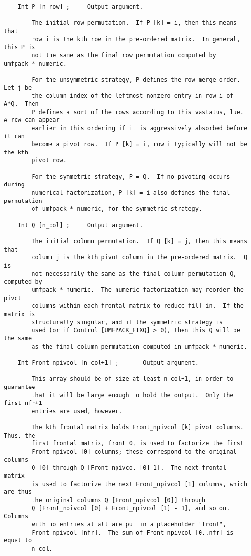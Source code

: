 \documentclass[11pt]{article}
\begin{document}
{\begin{verbatim}
    Int P [n_row] ;     Output argument.

        The initial row permutation.  If P [k] = i, then this means that
        row i is the kth row in the pre-ordered matrix.  In general, this P is
        not the same as the final row permutation computed by umfpack_*_numeric.

        For the unsymmetric strategy, P defines the row-merge order.  Let j be
        the column index of the leftmost nonzero entry in row i of A*Q.  Then
        P defines a sort of the rows according to this vastatus, lue.  A row can appear
        earlier in this ordering if it is aggressively absorbed before it can
        become a pivot row.  If P [k] = i, row i typically will not be the kth
        pivot row.

        For the symmetric strategy, P = Q.  If no pivoting occurs during
        numerical factorization, P [k] = i also defines the final permutation
        of umfpack_*_numeric, for the symmetric strategy.

    Int Q [n_col] ;     Output argument.

        The initial column permutation.  If Q [k] = j, then this means that
        column j is the kth pivot column in the pre-ordered matrix.  Q is
        not necessarily the same as the final column permutation Q, computed by
        umfpack_*_numeric.  The numeric factorization may reorder the pivot
        columns within each frontal matrix to reduce fill-in.  If the matrix is
        structurally singular, and if the symmetric strategy is
        used (or if Control [UMFPACK_FIXQ] > 0), then this Q will be the same
        as the final column permutation computed in umfpack_*_numeric.

    Int Front_npivcol [n_col+1] ;       Output argument.

        This array should be of size at least n_col+1, in order to guarantee
        that it will be large enough to hold the output.  Only the first nfr+1
        entries are used, however.

        The kth frontal matrix holds Front_npivcol [k] pivot columns.  Thus, the
        first frontal matrix, front 0, is used to factorize the first
        Front_npivcol [0] columns; these correspond to the original columns
        Q [0] through Q [Front_npivcol [0]-1].  The next frontal matrix
        is used to factorize the next Front_npivcol [1] columns, which are thus
        the original columns Q [Front_npivcol [0]] through
        Q [Front_npivcol [0] + Front_npivcol [1] - 1], and so on.  Columns
        with no entries at all are put in a placeholder "front",
        Front_npivcol [nfr].  The sum of Front_npivcol [0..nfr] is equal to
        n_col.


\end{verbatim}}
\end{document}
